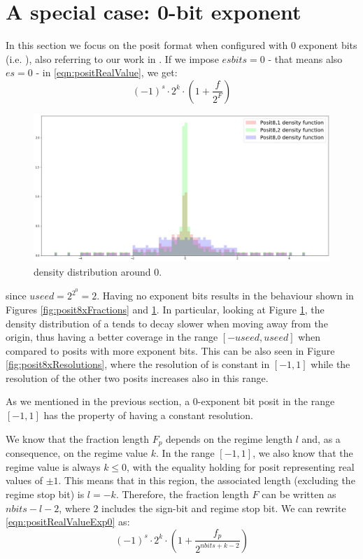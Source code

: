 \section{A special case: 0-bit exponent}\label{sec:Posit0bitExponent}

In this section we focus on the posit format when configured with 0 exponent bits (i.e. ), also referring to our work in \cite{coco2020sensors}. If we impose $esbits = 0$ - that means also $es = 0$ - in \eqref{eqn:positRealValue}, we get:
\begin{equation}\label{eqn:positRealValueExp0}
    (-1)^s \cdot \text{2}^{k} \cdot \left ( 1+ \frac{f}{2^F} \right)
\end{equation}


\begin{figure}
    \centering
    \includegraphics[width=\linewidth]{img/posit8xDensities.png}
    \caption{ density distribution around $0$.}
    \label{fig:posit8xDistributions}
\end{figure}

since $useed = 2^{2^0} = 2$. Having no exponent bits results in the behaviour shown in Figures \ref{fig:posit8xFractions} and \ref{fig:posit8xDistributions}. In particular, looking at Figure \ref{fig:posit8xDistributions}, the density distribution of a  tends to decay slower when moving away from the origin, thus having a better coverage in the range $[-useed,useed]$ when compared to posits with more exponent bits. This can be also seen in Figure \ref{fig:posit8xResolutions}, where the resolution of  is constant in $[-1,1]$ while the resolution of the other two posits increases also in this range. 

As we mentioned in the previous section, a 0-exponent bit posit in the range $[-1,1]$ has the property of having a constant resolution. 

We know that the fraction length $F_p$ depends on the regime length $l$ and, as a consequence, on the regime value $k$. In the range $[-1,1]$, we also know that the regime value is always $k \leq 0$, with the equality holding for posit representing real values of $\pm 1$. This means that in this region, the associated length (excluding the regime stop bit) is $l = - k$. Therefore, the fraction length $F$ can be written as $nbits - l - 2$, where $2$ includes the sign-bit and regime stop bit. We can rewrite \eqref{eqn:positRealValueExp0} as:
\begin{equation*}
    (-1)^s \cdot 2^k \cdot \left ( 1 + \frac{f_p}{2^{nbits + k - 2}} \right )
\end{equation*}

